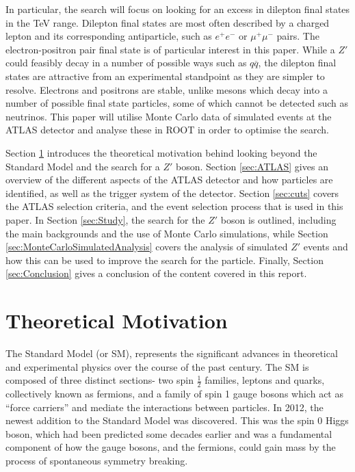 \documentclass{article}
\begin{document}
In particular, the search will focus on looking for an excess in dilepton final states in the TeV range. Dilepton final states are most often described by a charged lepton and its corresponding antiparticle, such as $e^+e^-$ or $\mu^+\mu^-$ pairs. The electron-positron pair final state is of particular interest in this paper. While a $Z'$ could feasibly decay in a number of possible ways such as $q\overline{q}$, the dilepton final states are attractive from an experimental standpoint as they are simpler to resolve. Electrons and positrons are stable, unlike mesons which decay into a number of possible final state particles, some of which cannot be detected such as neutrinos. This paper will utilise Monte Carlo data of simulated events at the ATLAS detector and analyse these in ROOT \cite{ROOT} in order to optimise the search.

Section \ref{sec:TheoreticalMotication} introduces the theoretical motivation behind looking beyond the Standard Model and the search for a $Z'$ boson. Section \ref{sec:ATLAS} gives an overview of the different aspects of the ATLAS detector and how particles are identified, as well as the trigger system of the detector. Section \ref{sec:cuts} covers the ATLAS selection criteria, and the event selection process that is used in this paper. In Section \ref{sec:Study}, the search for the $Z'$ boson is outlined, including the main backgrounds and the use of Monte Carlo simulations, while Section \ref{sec:MonteCarloSimulatedAnalysis} covers the analysis of simulated $Z'$ events and how this can be used to improve the search for the particle. Finally, Section \ref{sec:Conclusion} gives a conclusion of the content covered in this report.

\section{Theoretical Motivation}%
\label{sec:TheoreticalMotication}

The Standard Model (or SM), represents the significant advances in theoretical and experimental physics over the course of the past century. The SM is composed of three distinct sections- two spin $\frac{1}{2}$ families, leptons and quarks, collectively known as fermions, and a family of spin 1 gauge bosons which act as ``force carriers'' and mediate the interactions between particles. In 2012, the newest addition to the Standard Model was discovered. This was the spin 0 Higgs boson, which had been predicted some decades earlier and was a fundamental component of how the gauge bosons, and the fermions, could gain mass by the process of spontaneous symmetry breaking. 
\end{document}

